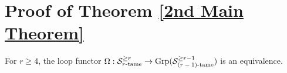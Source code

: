 %	
%
%	
%



\section{Proof of Theorem \ref{2nd Main Theorem}}
\label{proof of the 2nd main theorem}
\begin{proposition}
\label{tame recognition theorem}
For $r\geq 4$,
	the loop functor $\Omega: {\mathcal{S}}^{\geq r}_{\text{$r$-tame}}\to \operatorname{Grp}({\mathcal{S}}^{\geq r-1}_{\text{($r-1$)-tame}})$ is an equivalence. 
\end{proposition}

